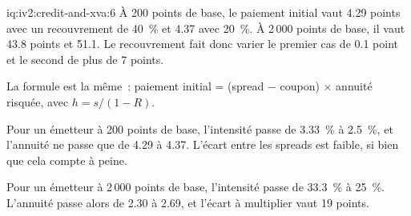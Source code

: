\begin{solution}{iq:iv2:credit-and-xva:6}
À 200 points de base, le paiement initial vaut 4.29 points avec un recouvrement de 40~\% et 4.37 avec 20~\%. À 2\,000 points de base, il vaut 43.8 points et 51.1. Le recouvrement fait donc varier le premier cas de 0.1 point et le second de plus de 7 points.

La formule est la même~: paiement initial = (spread $-$ coupon) $\times$ annuité risquée, avec $h = s/(1 - R)$.

Pour un émetteur à 200 points de base, l'intensité passe de 3.33~\% à 2.5~\%, et l'annuité ne passe que de 4.29 à 4.37. L'écart entre les spreads est faible, si bien que cela compte à peine.

Pour un émetteur à 2\,000 points de base, l'intensité passe de 33.3~\% à 25~\%. L'annuité passe alors de 2.30 à 2.69, et l'écart à multiplier vaut 19 points.

\end{solution}

